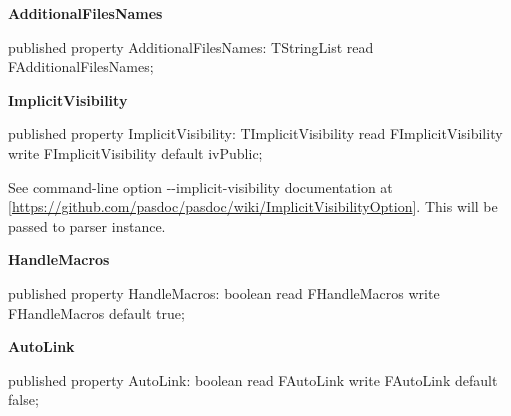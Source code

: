 \documentclass{report}
\newif\ifpdf
\begin{document}
\begin{list}{}
\begin{flushleft}
\ifpdf
\end{flushleft}
\fi


\par  \label{PasDoc_Base.TPasDoc-AdditionalFilesNames}
\item[\textbf{AdditionalFilesNames}\hfill]
\ifpdf
\begin{flushleft}
\fi
\begin{ttfamily}
published property AdditionalFilesNames: TStringList read FAdditionalFilesNames;\end{ttfamily}

\ifpdf
\end{flushleft}
\fi


\par  \label{PasDoc_Base.TPasDoc-ImplicitVisibility}
\item[\textbf{ImplicitVisibility}\hfill]
\ifpdf
\begin{flushleft}
\fi
\begin{ttfamily}
published property ImplicitVisibility: TImplicitVisibility
      read FImplicitVisibility write FImplicitVisibility default ivPublic;\end{ttfamily}

\ifpdf
\end{flushleft}
\fi


\par See command{-}line option {-}{-}implicit{-}visibility documentation at [\href{https://github.com/pasdoc/pasdoc/wiki/ImplicitVisibilityOption}{https://github.com/pasdoc/pasdoc/wiki/ImplicitVisibilityOption}]. This will be passed to parser instance.\label{PasDoc_Base.TPasDoc-HandleMacros}
\item[\textbf{HandleMacros}\hfill]
\ifpdf
\begin{flushleft}
\fi
\begin{ttfamily}
published property HandleMacros: boolean
      read FHandleMacros write FHandleMacros default true;\end{ttfamily}

\ifpdf
\end{flushleft}
\fi


\par  \label{PasDoc_Base.TPasDoc-AutoLink}
\item[\textbf{AutoLink}\hfill]
\ifpdf
\begin{flushleft}
\fi
\begin{ttfamily}
published property AutoLink: boolean
      read FAutoLink write FAutoLink default false;\end{ttfamily}


\end{flushleft}
\end{list}
\end{document}
